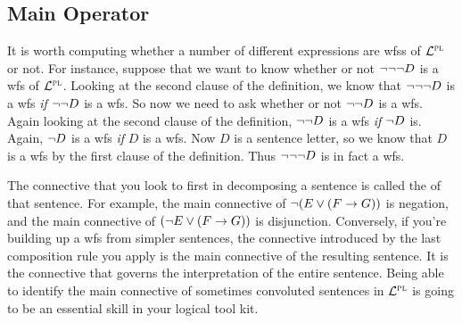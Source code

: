 \subsection{Main Operator}%
  \label{sub:main-operator}

It is worth computing whether a number of different expressions are wfss of $\mathcal{L}^{\textsc{pl}}$ or not.
For instance, suppose that we want to know whether or not $\neg \neg \neg D$ is a wfs of $\mathcal{L}^{\textsc{pl}}$.
Looking at the second clause of the definition, we know that $\neg \neg \neg D$ is a wfs \emph{if} $\neg \neg D$ is a wfs.
So now we need to ask whether or not $\neg \neg D$ is a wfs.
Again looking at the second clause of the definition, $\neg \neg D$ is a wfs \emph{if} $\neg D$ is.
Again, $\neg D$ is a wfs \emph{if} $D$ is a wfs.
Now $D$ is a sentence letter, so we know that $D$ is a wfs by the first clause of the definition.
Thus $\neg \neg \neg D$ is in fact a wfs. 

The connective that you look to first in decomposing a sentence is called the  of that sentence.
For example, the main connective of $\neg (E \vee (F \rightarrow G))$ is negation, and the main connective of $(\neg E \vee (F \rightarrow G))$ is disjunction.
Conversely, if you're building up a wfs from simpler sentences, the connective introduced by the last composition rule you apply is the main connective of the resulting sentence.
It is the connective that governs the interpretation of the entire sentence.
Being able to identify the main connective of sometimes convoluted sentences in $\mathcal{L}^{\textsc{pl}}$ is going to be an essential skill in your logical tool kit.



